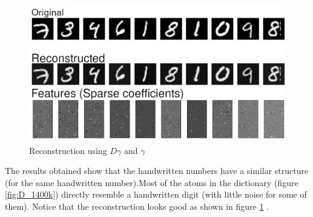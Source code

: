 \begin{figure}[h]
 \centering
 \includegraphics[scale=0.5]{normrecons.png}
 \caption{Reconstruction using $D \gamma$ and $\gamma$}
 \label{fig:Recons}
\end{figure}
The results obtained show that the handwritten numbers have a similar structure (for the same handwritten number).Most of the atoms in the dictionary (figure \ref{fig:D_1400k})  directly resemble a handwritten digit (with little noise for some of them). Notice that the reconstruction looks good as shown in figure \ref{fig:Recons} .
% 

